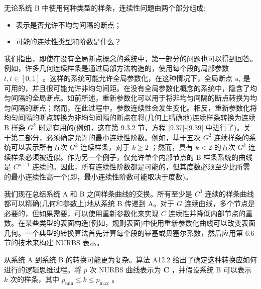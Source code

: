 \documentclass[../main.tex]{subfiles}
\begin{document}
无论系统 B 中使用何种类型的样条，连续性问题由两个部分组成:

\begin{itemize}
\item 表示是否允许不均匀间隔的断点；
\end{itemize}

\begin{itemize}
\item 可能的连续性类型和阶数是什么？
\end{itemize}

我们指出，即使在没有全局断点概念的系统中，第一部分的问题也可以得到回答。例如，许多几何连续样条是通过局部方法构造的，使用每个段的局部参数 \(t,t \in  \left\lbrack  {0,1}\right\rbrack\) 。这样的系统可能允许全局参数化，在这种情况下，全局断点 \({u}_{i}\) 是可用的，并且很可能允许非均匀间距。在没有全局参数化概念的系统中，隐含了均匀间隔的全局断点。如前所述，重新参数化可以用于将非均匀间隔的断点转换为均匀间隔的断点；然而，在此过程中，参数连续性会发生变化。相反，重新参数化将均匀间隔的断点转换为非均匀间隔的断点在将(几何上精确地)连续样条转换为连续 B 样条 \({G}^{k}\) 时是有用的(例如，这在第 9.3.2 节，方程 [9.37]-[9.39] 中进行了)。关于第二部分，必须确定允许的最小连续性阶数。例如，基于五次 \({G}^{2}\) 连续样条的系统可以表示所有五次 \({G}^{k}\) 连续样条，对于 \(k \geq  2\) ；然而，具有 \(k < 2\) 的五次 \({G}^{k}\) 连续样条必须被近似。作为另一个例子，仅允许单个内部节点的 B 样条系统的曲线是 \({C}^{p - 1}\) 连续的。因此，所有连续性阶数都是可能的，但其度数必须至少比所需的最小连续性高一个(即，最小连续性阶数可能取决于度数)。

我们现在总结系统 A 和 B 之间样条曲线的交换。所有至少是 \({C}^{0}\) 连续的样条曲线都可以精确(几何和参数上)地从系统 B 传递到 A。对于 \(G\) 连续曲线，多个节点是必要的，但如果需要，可以使用重新参数化来实现 \(C\) 连续性并降低内部节点的重数。在某些类型的表面构造(例如，规则表面)中使用重新参数化曲线可以改变表面几何。一个典型的转换算法首先计算每个段的幂基或贝塞尔系数，然后应用第 6.6 节的技术来构建 NURBS 表示。

从系统 A 到系统 B 的转换可能更为复杂。算法 A12.2 给出了确定这种转换应如何进行的逻辑思维过程。将 \(p\) 次 NURBS 曲线表示为 \(\mathbf{C}\) ，并假设系统 B 可以表示 \(k\) 次的样条，其中 \({p}_{\min } \leq  k \leq  {p}_{\max }\) 。
\end{document}
